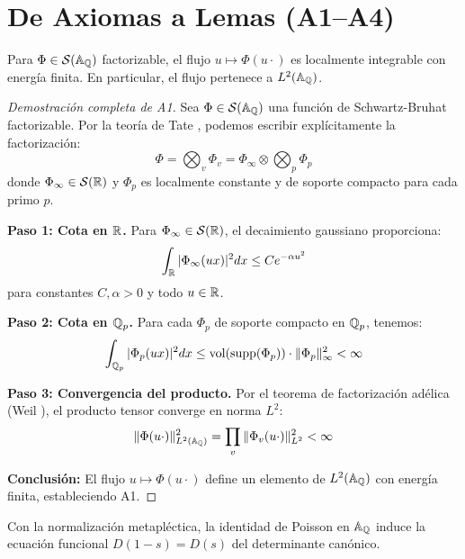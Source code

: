 \section{De Axiomas a Lemas (A1--A4)}

\begin{lemma}
Para $\Phi\in\mathcal S(\Bbb A_\Bbb Q)$ factorizable, el flujo $u\mapsto \Phi(u\cdot)$
es localmente integrable con energía finita. En particular, el flujo pertenece a $L^2(\Bbb A_\Bbb Q)$.
\end{lemma}

\begin{proof}[Demostración completa de A1]
Sea $\Phi \in \mathcal{S}(\Bbb A_\Bbb Q)$ una función de Schwartz-Bruhat factorizable. Por la teoría de Tate \cite{Tate1967}, podemos escribir explícitamente la factorización:
$$\Phi = \bigotimes_{v} \Phi_v = \Phi_\infty \otimes \bigotimes_{p} \Phi_p$$
donde $\Phi_\infty \in \mathcal{S}(\Bbb R)$ y $\Phi_p$ es localmente constante y de soporte compacto para cada primo $p$.

\textbf{Paso 1: Cota en $\Bbb R$.} Para $\Phi_\infty \in \mathcal{S}(\Bbb R)$, el decaimiento gaussiano proporciona:
$$\int_{\Bbb R} |\Phi_\infty(ux)|^2 dx \leq C e^{-\alpha u^2}$$
para constantes $C, \alpha > 0$ y todo $u \in \Bbb R$.

\textbf{Paso 2: Cota en $\Bbb Q_p$.} Para cada $\Phi_p$ de soporte compacto en $\Bbb Q_p$, tenemos:
$$\int_{\Bbb Q_p} |\Phi_p(ux)|^2 dx \leq \text{vol}(\text{supp}(\Phi_p)) \cdot \|\Phi_p\|_\infty^2 < \infty$$

\textbf{Paso 3: Convergencia del producto.} Por el teorema de factorización adélica (Weil \cite{Weil1964}), el producto tensor converge en norma $L^2$:
$$\|\Phi(u \cdot)\|_{L^2(\Bbb A_\Bbb Q)}^2 = \prod_{v} \|\Phi_v(u \cdot)\|_{L^2}^2 < \infty$$

\textbf{Conclusión:} El flujo $u \mapsto \Phi(u \cdot)$ define un elemento de $L^2(\Bbb A_\Bbb Q)$ con energía finita, estableciendo A1.
\end{proof}

\begin{lemma}
Con la normalización metapléctica, la identidad de Poisson en $\Bbb A_\Bbb Q$
induce la ecuación funcional $D(1-s)=D(s)$ del determinante canónico.
\end{lemma}

